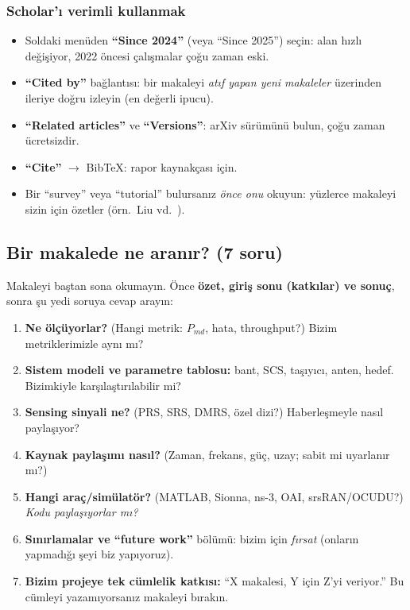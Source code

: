 \subsubsection{Scholar'ı verimli kullanmak}

\begin{itemize}
\item Soldaki menüden \textbf{``Since 2024''} (veya ``Since 2025'') seçin: alan hızlı değişiyor, 2022 öncesi çalışmalar çoğu zaman eski.
\item \textbf{``Cited by''} bağlantısı: bir makaleyi \emph{atıf yapan yeni makaleler} üzerinden ileriye doğru izleyin (en değerli ipucu).
\item \textbf{``Related articles''} ve \textbf{``Versions''}: arXiv sürümünü bulun, çoğu zaman ücretsizdir.
\item \textbf{``Cite''} $\rightarrow$ BibTeX: rapor kaynakçası için.
\item Bir ``survey'' veya ``tutorial'' bulursanız \emph{önce onu} okuyun: yüzlerce makaleyi sizin için özetler (örn.\ Liu vd.~\cite{liu22}).
\end{itemize}

\subsection{Bir makalede ne aranır? (7 soru)}\label{sec:7soru}

Makaleyi baştan sona okumayın. Önce \textbf{özet, giriş sonu (katkılar) ve sonuç}, sonra şu yedi soruya cevap arayın:

\begin{enumerate}
\item \textbf{Ne ölçüyorlar?} (Hangi metrik: $P_{md}$, hata, throughput?) Bizim metriklerimizle aynı mı?
\item \textbf{Sistem modeli ve parametre tablosu:} bant, SCS, taşıyıcı, anten, hedef. Bizimkiyle karşılaştırılabilir mi?
\item \textbf{Sensing sinyali ne?} (PRS, SRS, DMRS, özel dizi?) Haberleşmeyle nasıl paylaşıyor?
\item \textbf{Kaynak paylaşımı nasıl?} (Zaman, frekans, güç, uzay; sabit mi uyarlanır mı?)
\item \textbf{Hangi araç/simülatör?} (MATLAB, Sionna, ns-3, OAI, srsRAN/OCUDU?) \emph{Kodu paylaşıyorlar mı?}
\item \textbf{Sınırlamalar ve ``future work''} bölümü: bizim için \emph{fırsat} (onların yapmadığı şeyi biz yapıyoruz).
\item \textbf{Bizim projeye tek cümlelik katkısı:} ``X makalesi, Y için Z'yi veriyor.'' Bu cümleyi yazamıyorsanız makaleyi bırakın.
\end{enumerate}

